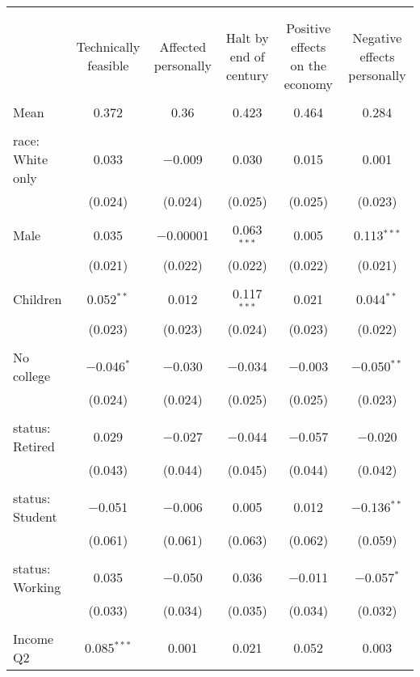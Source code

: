 
\begin{tabular}{@{\extracolsep{5pt}}lccccc} 
\\[-1.8ex]\hline 
\hline \\[-1.8ex] 
\\[-1.8ex] & Technically feasible & Affected personally & Halt by end of century & Positive effects on the economy & Negative effects personally \\ 
\hline \\[-1.8ex] 
 Mean & 0.372 & 0.36 & 0.423 & 0.464 & 0.284  \\ \hline \\[-1.8ex] race: White only & 0.033 & $-$0.009 & 0.030 & 0.015 & 0.001 \\ 
  & (0.024) & (0.024) & (0.025) & (0.025) & (0.023) \\ 
  & & & & & \\ 
 Male & 0.035 & $-$0.00001 & 0.063$^{***}$ & 0.005 & 0.113$^{***}$ \\ 
  & (0.021) & (0.022) & (0.022) & (0.022) & (0.021) \\ 
  & & & & & \\ 
 Children & 0.052$^{**}$ & 0.012 & 0.117$^{***}$ & 0.021 & 0.044$^{**}$ \\ 
  & (0.023) & (0.023) & (0.024) & (0.023) & (0.022) \\ 
  & & & & & \\ 
 No college & $-$0.046$^{*}$ & $-$0.030 & $-$0.034 & $-$0.003 & $-$0.050$^{**}$ \\ 
  & (0.024) & (0.024) & (0.025) & (0.025) & (0.023) \\ 
  & & & & & \\ 
 status: Retired & 0.029 & $-$0.027 & $-$0.044 & $-$0.057 & $-$0.020 \\ 
  & (0.043) & (0.044) & (0.045) & (0.044) & (0.042) \\ 
  & & & & & \\ 
 status: Student & $-$0.051 & $-$0.006 & 0.005 & 0.012 & $-$0.136$^{**}$ \\ 
  & (0.061) & (0.061) & (0.063) & (0.062) & (0.059) \\ 
  & & & & & \\ 
 status: Working & 0.035 & $-$0.050 & 0.036 & $-$0.011 & $-$0.057$^{*}$ \\ 
  & (0.033) & (0.034) & (0.035) & (0.034) & (0.032) \\ 
  & & & & & \\ 
 Income Q2 & 0.085$^{***}$ & 0.001 & 0.021 & 0.052 & 0.003 \\ 

\end{tabular}
